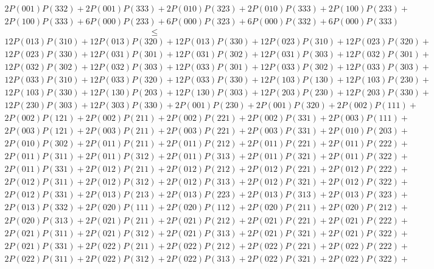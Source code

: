 \begin{align*}
	2P(001)P(332) + 2P(001)P(333) + 2P(010)P(323) + 2P(010)P(333) + 2P(100)P(233)+ \\
	2P(100)P(333) + 6P(000)P(233) + 6P(000)P(323) + 6P(000)P(332) + 6P(000)P(333)
\end{align*}
\[\leq\]
\begin{align*}
	12P(013)P(310) + 12P(013)P(320) + 12P(013)P(330) + 12P(023)P(310) + 12P(023)P(320)+ \\
	12P(023)P(330) + 12P(031)P(301) + 12P(031)P(302) + 12P(031)P(303) + 12P(032)P(301)+ \\
	12P(032)P(302) + 12P(032)P(303) + 12P(033)P(301) + 12P(033)P(302) + 12P(033)P(303)+ \\
	12P(033)P(310) + 12P(033)P(320) + 12P(033)P(330) + 12P(103)P(130) + 12P(103)P(230)+ \\
	12P(103)P(330) + 12P(130)P(203) + 12P(130)P(303) + 12P(203)P(230) + 12P(203)P(330)+ \\
	12P(230)P(303) + 12P(303)P(330) + 2P(001)P(230) + 2P(001)P(320) + 2P(002)P(111)+ \\
	2P(002)P(121) + 2P(002)P(211) + 2P(002)P(221) + 2P(002)P(331) + 2P(003)P(111)+ \\
	2P(003)P(121) + 2P(003)P(211) + 2P(003)P(221) + 2P(003)P(331) + 2P(010)P(203)+ \\
	2P(010)P(302) + 2P(011)P(211) + 2P(011)P(212) + 2P(011)P(221) + 2P(011)P(222)+ \\
	2P(011)P(311) + 2P(011)P(312) + 2P(011)P(313) + 2P(011)P(321) + 2P(011)P(322)+ \\
	2P(011)P(331) + 2P(012)P(211) + 2P(012)P(212) + 2P(012)P(221) + 2P(012)P(222)+ \\
	2P(012)P(311) + 2P(012)P(312) + 2P(012)P(313) + 2P(012)P(321) + 2P(012)P(322)+ \\
	2P(012)P(331) + 2P(013)P(213) + 2P(013)P(223) + 2P(013)P(313) + 2P(013)P(323)+ \\
	2P(013)P(332) + 2P(020)P(111) + 2P(020)P(112) + 2P(020)P(211) + 2P(020)P(212)+ \\
	2P(020)P(313) + 2P(021)P(211) + 2P(021)P(212) + 2P(021)P(221) + 2P(021)P(222)+ \\
	2P(021)P(311) + 2P(021)P(312) + 2P(021)P(313) + 2P(021)P(321) + 2P(021)P(322)+ \\
	2P(021)P(331) + 2P(022)P(211) + 2P(022)P(212) + 2P(022)P(221) + 2P(022)P(222)+ \\
	2P(022)P(311) + 2P(022)P(312) + 2P(022)P(313) + 2P(022)P(321) + 2P(022)P(322)+ \\

\end{align*}
